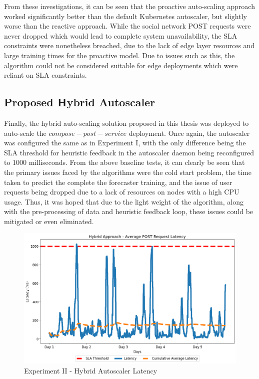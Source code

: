 From these investigations, it can be seen that the proactive auto-scaling approach worked significantly better than the default Kubernetes autoscaler, but slightly worse than the reactive approach. While the social network POST requests were never dropped which would lead to complete system unavailability, the SLA constraints were nonetheless breached, due to the lack of edge layer resources and large training times for the proactive model. Due to issues such as this, the algorithm could not be considered suitable for edge deployments which were reliant on SLA constraints.\par

\subsection {Proposed Hybrid Autoscaler}
\label{subsec:ch5-exp2-hybrid-algo}

Finally, the hybrid auto-scaling solution proposed in this thesis was deployed to auto-scale the $compose-post-service$ deployment. Once again, the autoscaler was configured the same as in Experiment I, with the only difference being the SLA threshold for heuristic feedback in the autoscaler daemon being reconfigured to 1000 milliseconds. From the above baseline tests, it can clearly be seen that the primary issues faced by the algorithms were the cold start problem, the time taken to predict the complete the forecaster training, and the issue of user requests being dropped due to a lack of resources on nodes with a high CPU usage. Thus, it was hoped that due to the light weight of the algorithm, along with the pre-processing of data and heuristic feedback loop, these issues could be mitigated or even eliminated.\par

\begin{figure}[htb]
    \centering
    \caption{Experiment II - Hybrid Autoscaler Latency}
    \label{fig:exp2-hybrid-k8s}
    \includegraphics[width=0.6\linewidth]{Figures/Compose-Post-Hybrid-Latency.png}
\end{figure}

